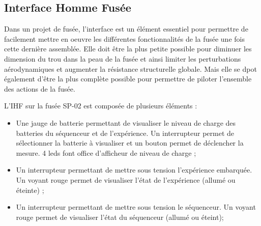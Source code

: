\subsection{Interface Homme Fusée}

Dans un projet de fusée, l'interface est un élément essentiel pour permettre de facilement mettre en oeuvre les différentes
fonctionnalités de la fusée une fois cette dernière assemblée. Elle doit être la plus petite possible pour diminuer les
dimension du trou dans la peau de la fusée et ainsi limiter les perturbations aérodynamiques et augmenter la résistance
structurelle globale. Mais elle se dpot également d'être la plus complète possible pour permettre de piloter l'ensemble des
actions de la fusée.\\

\hspace*{-\parindent}%
\begin{minipage}{0.35\textwidth}
    \noindent L'\acrfull{IHF} sur la fusée SP-02 est composée de plusieurs éléments :
    \begin{itemize}
        \item Une jauge de batterie permettant de visualiser le niveau de charge des batteries du séquenceur et de l'expérience.
        Un interrupteur permet de sélectionner la batterie à visualiser et un bouton permet de déclencher la mesure. 4 leds font
        office d'afficheur de niveau de charge ; \\
        \item Un interrupteur permettant de mettre sous tension l'expérience embarquée. Un voyant rouge permet de visualiser
        l'état de l'expérience (allumé ou éteinte) ; \\
        \item Un interrupteur permettant de mettre sous tension le séquenceur. Un voyant rouge permet de visualiser l'état du
        séquenceur (allumé ou éteint);
    \end{itemize}
\end{minipage}
\hfill
